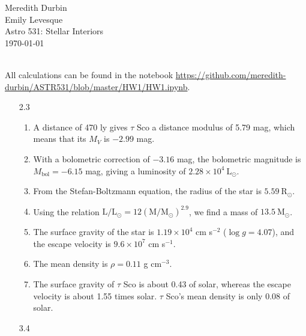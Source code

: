 \documentclass[11pt]{article}
\newcommand\lsol{\mathrm{L}_\odot}
\newcommand\rsol{\mathrm{R}_\odot}
\newcommand\msol{\mathrm{M}_\odot}
\begin{document}
\begin{flushright}Meredith Durbin\\
Emily Levesque\\
Astro 531: Stellar Interiors\\
\today\\

\end{flushright}

 \\[6pt]

All calculations can be found in the notebook \url{https://github.com/meredith-durbin/ASTR531/blob/master/HW1/HW1.ipynb}.


\begin{enumerate}

\item [2.3]
	\begin{enumerate}
	
    \item A distance of 470 ly gives $\tau$ Sco a distance modulus of 5.79 mag, which means that its $M_V$ is $-2.99$ mag.
    
    \item With a bolometric correction of $-3.16$ mag, the bolometric magnitude is $M_\mathrm{bol} = -6.15$ mag, giving a luminosity of $2.28 \times 10^4~\lsol$.
    
    \item From the Stefan-Boltzmann equation, the radius of the star is $5.59~\rsol$.

    \item Using the relation $\mathrm{L}/\lsol = 12(\mathrm{M}/\msol)^{2.9}$, we find a mass of $13.5~\msol$.
    
    \item The surface gravity of the star is $1.19 \times 10^4$ cm s$^{-2}$ ($\log g = 4.07$), and the escape velocity is $9.6 \times 10^7$ cm s$^{-1}$.
    
    \item The mean density is $\rho = 0.11$ g cm$^{-3}$.
    
    \item The surface gravity of $\tau$ Sco is about 0.43 of solar, whereas the escape velocity is about 1.55 times solar. $\tau$ Sco's mean density is only 0.08 of solar.
    
    \end{enumerate}

\item [3.4]


\end{enumerate}
\end{document}
